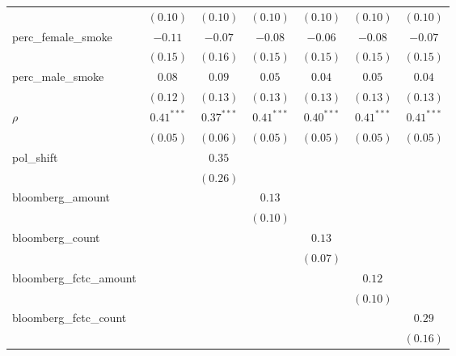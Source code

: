 \begin{table}[!h]
\begin{center}
\begin{tabular}{l c c c c c c }
                        & $(0.10)$     & $(0.10)$     & $(0.10)$     & $(0.10)$     & $(0.10)$     & $(0.10)$     \\
perc\_female\_smoke     & $-0.11$      & $-0.07$      & $-0.08$      & $-0.06$      & $-0.08$      & $-0.07$      \\
                        & $(0.15)$     & $(0.16)$     & $(0.15)$     & $(0.15)$     & $(0.15)$     & $(0.15)$     \\
perc\_male\_smoke       & $0.08$       & $0.09$       & $0.05$       & $0.04$       & $0.05$       & $0.04$       \\
                        & $(0.12)$     & $(0.13)$     & $(0.13)$     & $(0.13)$     & $(0.13)$     & $(0.13)$     \\
$\rho$                  & $0.41^{***}$ & $0.37^{***}$ & $0.41^{***}$ & $0.40^{***}$ & $0.41^{***}$ & $0.41^{***}$ \\
                        & $(0.05)$     & $(0.06)$     & $(0.05)$     & $(0.05)$     & $(0.05)$     & $(0.05)$     \\
pol\_shift              &              & $0.35$       &              &              &              &              \\
                        &              & $(0.26)$     &              &              &              &              \\
bloomberg\_amount       &              &              & $0.13$       &              &              &              \\
                        &              &              & $(0.10)$     &              &              &              \\
bloomberg\_count        &              &              &              & $0.13$       &              &              \\
                        &              &              &              & $(0.07)$     &              &              \\
bloomberg\_fctc\_amount &              &              &              &              & $0.12$       &              \\
                        &              &              &              &              & $(0.10)$     &              \\
bloomberg\_fctc\_count  &              &              &              &              &              & $0.29$       \\
                        &              &              &              &              &              & $(0.16)$     \\

\end{tabular}
\end{center}
\end{table}

